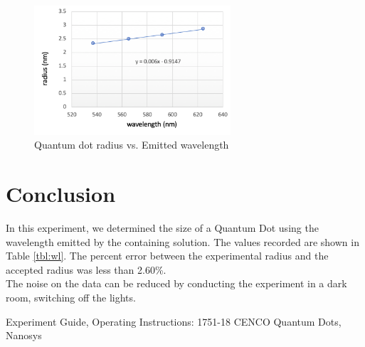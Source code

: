 \documentclass[12pt]{report}
\begin{document}
\begin{figure}
    \centering
    \includegraphics[width=0.65\textwidth] {images/r-w}
    \caption{Quantum dot radius vs. Emitted wavelength}
    \label{fig:qd_plot}
\end{figure}
    
\section{Conclusion}
In this experiment, we determined the size of a Quantum Dot using the wavelength emitted by the containing solution. The values recorded are shown in Table \ref{tbl:wl}. The percent error between the experimental radius and the accepted radius was less than 2.60\%.  \\
The noise on the data can be reduced by conducting the experiment in a dark room, switching off the lights.

 
\begin{thebibliography}{9}
   
  
   Experiment Guide, Operating Instructions: 1751-18 CENCO Quantum Dots, Nanosys

\end{thebibliography}
\end{document}
